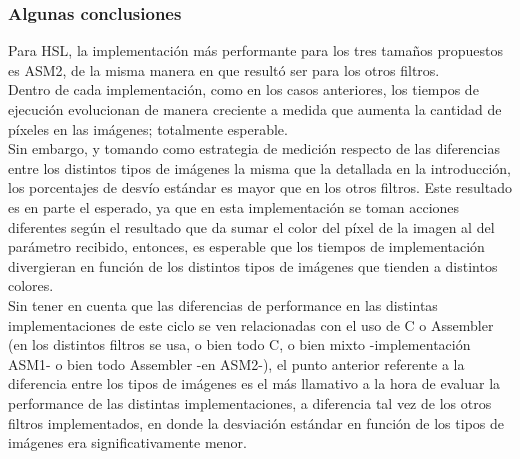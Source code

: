 \subsubsection{Algunas conclusiones}
Para HSL, la implementación más performante para los tres tamaños propuestos es ASM2, de la misma manera en que resultó ser para los otros filtros.\\
Dentro de cada implementación, como en los casos anteriores, los tiempos de ejecución evolucionan de manera creciente a medida que aumenta la cantidad de píxeles en las imágenes; totalmente esperable.\\

Sin embargo, y tomando como estrategia de medición respecto de las diferencias entre los distintos tipos de imágenes la misma que la detallada en la introducción, los porcentajes de desvío estándar es mayor que en los otros filtros. Este resultado es en parte el esperado, ya que en esta implementación se toman acciones diferentes según el resultado que da sumar el color del píxel de la imagen al del parámetro recibido, entonces, es esperable que los tiempos de implementación divergieran en función de los distintos tipos de imágenes que tienden a distintos colores.\\

Sin tener en cuenta que las diferencias de performance en las distintas implementaciones de este ciclo se ven relacionadas con el uso de C o Assembler (en los distintos filtros se usa, o bien todo C, o bien mixto -implementación ASM1- o bien todo Assembler -en ASM2-), el punto anterior referente a la diferencia entre los tipos de imágenes es el más llamativo a la hora de evaluar la performance de las distintas implementaciones, a diferencia tal vez de los otros filtros implementados, en donde la desviación estándar en función de los tipos de imágenes era significativamente menor. 
